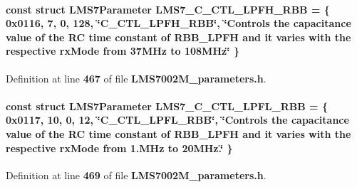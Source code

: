 \paragraph[{L\+M\+S7\+\_\+\+C\+\_\+\+C\+T\+L\+\_\+\+L\+P\+F\+H\+\_\+\+R\+BB}]{\setlength{\rightskip}{0pt plus 5cm}const struct {\bf L\+M\+S7\+Parameter} L\+M\+S7\+\_\+\+C\+\_\+\+C\+T\+L\+\_\+\+L\+P\+F\+H\+\_\+\+R\+BB = \{ 0x0116, 7, 0, 128, \char`\"{}\+C\+\_\+\+C\+T\+L\+\_\+\+L\+P\+F\+H\+\_\+\+R\+B\+B\char`\"{}, \char`\"{}\+Controls the capacitance value of the R\+C time constant of R\+B\+B\+\_\+\+L\+P\+F\+H and it varies with the respective rx\+Mode from 37\+M\+Hz to 108\+M\+Hz\char`\"{} \}\hspace{0.3cm}{\ttfamily [static]}}\label{LMS7002M__parameters_8h_af51497983e354a0f1a95cfe9d001b050}


Definition at line {\bf 467} of file {\bf L\+M\+S7002\+M\+\_\+parameters.\+h}.

\paragraph[{L\+M\+S7\+\_\+\+C\+\_\+\+C\+T\+L\+\_\+\+L\+P\+F\+L\+\_\+\+R\+BB}]{\setlength{\rightskip}{0pt plus 5cm}const struct {\bf L\+M\+S7\+Parameter} L\+M\+S7\+\_\+\+C\+\_\+\+C\+T\+L\+\_\+\+L\+P\+F\+L\+\_\+\+R\+BB = \{ 0x0117, 10, 0, 12, \char`\"{}\+C\+\_\+\+C\+T\+L\+\_\+\+L\+P\+F\+L\+\_\+\+R\+B\+B\char`\"{}, \char`\"{}\+Controls the capacitance value of the R\+C time constant of R\+B\+B\+\_\+\+L\+P\+F\+H and it varies with the respective rx\+Mode from 1.\+M\+Hz to 20\+M\+Hz.\char`\"{} \}\hspace{0.3cm}{\ttfamily [static]}}\label{LMS7002M__parameters_8h_acf6a81bc6de5c90648634eb95ab75dc3}


Definition at line {\bf 469} of file {\bf L\+M\+S7002\+M\+\_\+parameters.\+h}.

